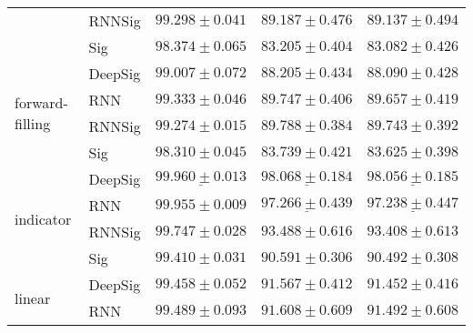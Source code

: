 \begin{tabular}{lllll}
                                 & RNNSig  &                           $ 99.298 \pm 0.041 $ &                           $ 89.187 \pm 0.476 $ &                           $ 89.137 \pm 0.494 $ \\
                                 & Sig     &                           $ 98.374 \pm 0.065 $ &                           $ 83.205 \pm 0.404 $ &                           $ 83.082 \pm 0.426 $ \\
\midrule
\multirow{4}{*}{forward-filling} & DeepSig &                           $ 99.007 \pm 0.072 $ &                           $ 88.205 \pm 0.434 $ &                           $ 88.090 \pm 0.428 $ \\
                                 & RNN     &                           $ 99.333 \pm 0.046 $ &                           $ 89.747 \pm 0.406 $ &                           $ 89.657 \pm 0.419 $ \\
                                 & RNNSig  &                           $ 99.274 \pm 0.015 $ &                           $ 89.788 \pm 0.384 $ &                           $ 89.743 \pm 0.392 $ \\
                                 & Sig     &                           $ 98.310 \pm 0.045 $ &                           $ 83.739 \pm 0.421 $ &                           $ 83.625 \pm 0.398 $ \\
\midrule
\multirow{4}{*}{indicator}       & DeepSig &  $  \mathbf{ \underline{ 99.960 \pm 0.013 }} $ &  $  \mathbf{ \underline{ 98.068 \pm 0.184 }} $ &  $  \mathbf{ \underline{ 98.056 \pm 0.185 }} $ \\
                                 & RNN     &               $  \mathbf{ 99.955 \pm 0.009 } $ &            $  \underline{ 97.266 \pm 0.439 } $ &            $  \underline{ 97.238 \pm 0.447 } $ \\
                                 & RNNSig  &                           $ 99.747 \pm 0.028 $ &                           $ 93.488 \pm 0.616 $ &                           $ 93.408 \pm 0.613 $ \\
                                 & Sig     &                           $ 99.410 \pm 0.031 $ &                           $ 90.591 \pm 0.306 $ &                           $ 90.492 \pm 0.308 $ \\
\midrule
\multirow{4}{*}{linear}          & DeepSig &                           $ 99.458 \pm 0.052 $ &                           $ 91.567 \pm 0.412 $ &                           $ 91.452 \pm 0.416 $ \\
                                 & RNN     &                           $ 99.489 \pm 0.093 $ &                           $ 91.608 \pm 0.609 $ &                           $ 91.492 \pm 0.608 $ \\

\end{tabular}
